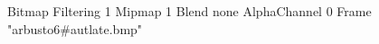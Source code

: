 {Bitmap
	{Filtering 1}
	{Mipmap 1}
	{Blend none}
	{AlphaChannel 0}
	{Frame "arbusto6#autlate.bmp"}
}
